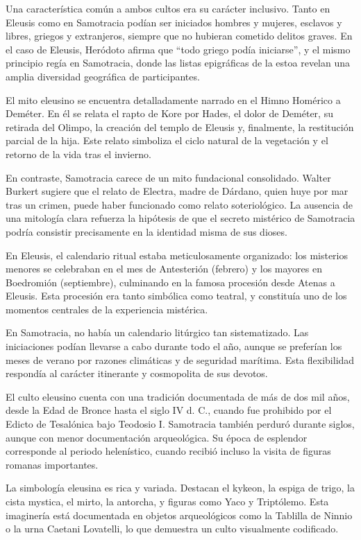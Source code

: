Una característica común a ambos cultos era su carácter inclusivo. Tanto en Eleusis como en Samotracia podían ser iniciados hombres y mujeres, esclavos y libres, griegos y extranjeros, siempre que no hubieran cometido delitos graves. En el caso de Eleusis, Heródoto afirma que “todo griego podía iniciarse”, y el mismo principio regía en Samotracia, donde las listas epigráficas de la estoa revelan una amplia diversidad geográfica de participantes.

El mito eleusino se encuentra detalladamente narrado en el Himno Homérico a Deméter. En él se relata el rapto de Kore por Hades, el dolor de Deméter, su retirada del Olimpo, la creación del templo de Eleusis y, finalmente, la restitución parcial de la hija. Este relato simboliza el ciclo natural de la vegetación y el retorno de la vida tras el invierno.

En contraste, Samotracia carece de un mito fundacional consolidado. Walter Burkert sugiere que el relato de Electra, madre de Dárdano, quien huye por mar tras un crimen, puede haber funcionado como relato soteriológico. La ausencia de una mitología clara refuerza la hipótesis de que el secreto mistérico de Samotracia podría consistir precisamente en la identidad misma de sus dioses.

En Eleusis, el calendario ritual estaba meticulosamente organizado: los misterios menores se celebraban en el mes de Antesterión (febrero) y los mayores en Boedromión (septiembre), culminando en la famosa procesión desde Atenas a Eleusis. Esta procesión era tanto simbólica como teatral, y constituía uno de los momentos centrales de la experiencia mistérica.

En Samotracia, no había un calendario litúrgico tan sistematizado. Las iniciaciones podían llevarse a cabo durante todo el año, aunque se preferían los meses de verano por razones climáticas y de seguridad marítima. Esta flexibilidad respondía al carácter itinerante y cosmopolita de sus devotos.

El culto eleusino cuenta con una tradición documentada de más de dos mil años, desde la Edad de Bronce hasta el siglo IV d. C., cuando fue prohibido por el Edicto de Tesalónica bajo Teodosio I. Samotracia también perduró durante siglos, aunque con menor documentación arqueológica. Su época de esplendor corresponde al periodo helenístico, cuando recibió incluso la visita de figuras romanas importantes.

La simbología eleusina es rica y variada. Destacan el kykeon, la espiga de trigo, la cista mystica, el mirto, la antorcha, y figuras como Yaco y Triptólemo. Esta imaginería está documentada en objetos arqueológicos como la Tablilla de Ninnio o la urna Caetani Lovatelli, lo que demuestra un culto visualmente codificado.

